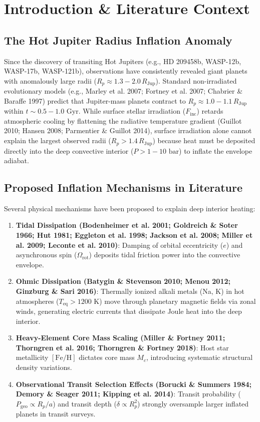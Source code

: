 \section{Introduction \& Literature Context}

\subsection{The Hot Jupiter Radius Inflation Anomaly}
Since the discovery of transiting Hot Jupiters (e.g., HD 209458b, WASP-12b, WASP-17b, WASP-121b), observations have consistently revealed giant planets with anomalously large radii ($R_p \approx 1.3 - 2.0\,R_{\mathrm{Jup}}$). Standard non-irradiated evolutionary models (e.g., Marley et al. 2007; Fortney et al. 2007; Chabrier \& Baraffe 1997) predict that Jupiter-mass planets contract to $R_p \approx 1.0 - 1.1\,R_{\mathrm{Jup}}$ within $t \sim 0.5 - 1.0\text{ Gyr}$. While surface stellar irradiation ($F_{\text{inc}}$) retards atmospheric cooling by flattening the radiative temperature gradient (Guillot 2010; Hansen 2008; Parmentier \& Guillot 2014), surface irradiation alone cannot explain the largest observed radii ($R_p > 1.4\,R_{\mathrm{Jup}}$) because heat must be deposited directly into the deep convective interior ($P > 1 - 10\text{ bar}$) to inflate the envelope adiabat.

\subsection{Proposed Inflation Mechanisms in Literature}
Several physical mechanisms have been proposed to explain deep interior heating:
\begin{enumerate}
    \item \textbf{Tidal Dissipation (Bodenheimer et al. 2001; Goldreich \& Soter 1966; Hut 1981; Eggleton et al. 1998; Jackson et al. 2008; Miller et al. 2009; Leconte et al. 2010)}: Damping of orbital eccentricity ($e$) and asynchronous spin ($\Omega_{\mathrm{rot}}$) deposits tidal friction power into the convective envelope.
    \item \textbf{Ohmic Dissipation (Batygin \& Stevenson 2010; Menou 2012; Ginzburg \& Sari 2016)}: Thermally ionized alkali metals (Na, K) in hot atmospheres ($T_{\text{eq}} > 1200\text{ K}$) move through planetary magnetic fields via zonal winds, generating electric currents that dissipate Joule heat into the deep interior.
    \item \textbf{Heavy-Element Core Mass Scaling (Miller \& Fortney 2011; Thorngren et al. 2016; Thorngren \& Fortney 2018)}: Host star metallicity $[\mathrm{Fe/H}]$ dictates core mass $M_c$, introducing systematic structural density variations.
    \item \textbf{Observational Transit Selection Effects (Borucki \& Summers 1984; Demory \& Seager 2011; Kipping et al. 2014)}: Transit probability ($P_{\text{geo}} \propto R_p / a$) and transit depth ($\delta \propto R_p^2$) strongly oversample larger inflated planets in transit surveys.
\end{enumerate}

